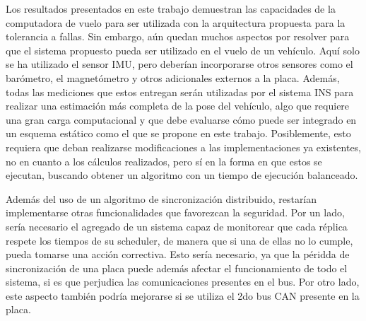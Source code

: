 Los resultados presentados en este trabajo demuestran las capacidades de la computadora de vuelo para ser utilizada con la arquitectura propuesta para la tolerancia a fallas. Sin embargo, aún quedan muchos aspectos por resolver para que el sistema propuesto pueda ser utilizado en el vuelo de un vehículo. Aquí solo se ha utilizado el sensor IMU, pero deberían incorporarse otros sensores como el barómetro, el magnetómetro y otros adicionales externos a la placa. Además, todas las mediciones que estos entregan serán utilizadas por el sistema INS para realizar una estimación más completa de la pose del vehículo, algo que requiere una gran carga computacional y que debe evaluarse cómo puede ser integrado en un esquema estático como el que se propone en este trabajo. Posiblemente, esto requiera que deban realizarse modificaciones a las implementaciones ya existentes, no en cuanto a los cálculos realizados, pero sí en la forma en que estos se ejecutan, buscando obtener un algoritmo con un tiempo de ejecución balanceado. 

Además del uso de un algoritmo de sincronización distribuido, restarían implementarse otras funcionalidades que favorezcan la seguridad. Por un lado, sería necesario el agregado de un sistema capaz de monitorear que cada réplica respete los tiempos de su scheduler, de manera que si una de ellas no lo cumple, pueda tomarse una acción correctiva. Esto sería necesario, ya que la péridda de sincronización de una placa puede además afectar el funcionamiento de todo el sistema, si es que perjudica las comunicaciones presentes en el bus. Por otro lado, este aspecto también podría mejorarse si se utiliza el 2do bus CAN presente en la placa.